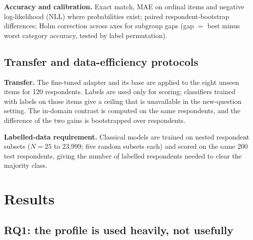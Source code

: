 \documentclass[conference]{IEEEtran}
\begin{document}
\textbf{Accuracy and calibration.} Exact match, MAE on ordinal items and negative log-likelihood (NLL) where probabilities exist; paired respondent-bootstrap differences; Holm correction across axes for subgroup gaps (gap $=$ best minus worst category accuracy, tested by label permutation).

\subsection{Transfer and data-efficiency protocols}

\textbf{Transfer.} The fine-tuned adapter and its base are applied to the eight unseen items for 120 respondents. Labels are used only for scoring; classifiers trained with labels on those items give a ceiling that is unavailable in the new-question setting. The in-domain contrast is computed on the same respondents, and the difference of the two gains is bootstrapped over respondents.

\textbf{Labelled-data requirement.} Classical models are trained on nested respondent subsets ($N=25$ to 23{,}999; five random subsets each) and scored on the same 200 test respondents, giving the number of labelled respondents needed to clear the majority class.

\section{Results}

\subsection{RQ1: the profile is used heavily, not usefully}

\begin{table}[!t]
\caption{Pew, 200 held-out respondents (1{,}548 rows; the direction and variance columns exclude one non-ordinal item, 1{,}351 rows and 182 cells). Dir.\ $r$: correlation between predicted and true group differences. Profile var.: share of variance explained by the profile beyond item effects.}
\label{tab:controls}
\centering
\scriptsize

\end{table}
\end{document}

